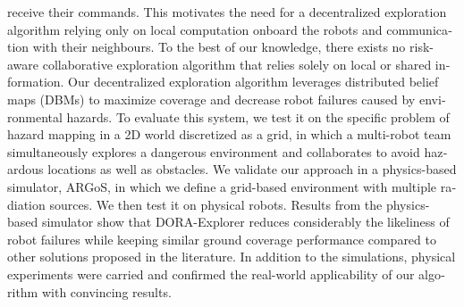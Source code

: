 \begin{otherlanguage}{english}
receive their commands. This motivates the need for a decentralized
exploration algorithm relying only on local computation onboard the
robots and communication with their neighbours. To the best of our knowledge, there exists no risk-aware collaborative exploration algorithm that relies solely on local or shared
information. Our decentralized exploration algorithm leverages distributed belief maps (DBMs) to maximize coverage and decrease robot failures caused by environmental hazards. To evaluate this system, we test it on the specific problem of
hazard mapping in a 2D world discretized as a grid, in which a
multi-robot team simultaneously explores a dangerous environment and
collaborates to avoid hazardous locations as well as obstacles. We validate our approach in a physics-based simulator, ARGoS, in which we define a grid-based environment
with multiple radiation sources. We then test it on physical
robots. Results from the physics-based simulator show that DORA-Explorer reduces considerably the likeliness of robot failures while keeping similar ground coverage performance compared to other solutions proposed in the literature. In addition to the simulations, physical experiments were carried and confirmed the real-world applicability of our algorithm with convincing results. 


\end{otherlanguage}
